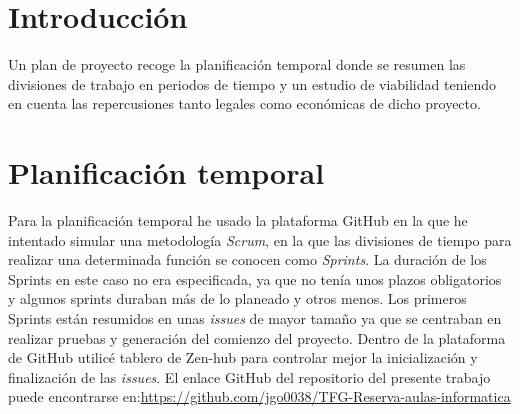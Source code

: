 
\section{Introducción}
Un plan de proyecto recoge la planificación temporal donde se resumen las divisiones de trabajo en periodos de tiempo y un estudio de viabilidad teniendo en cuenta las repercusiones tanto legales como económicas de dicho proyecto.

\section{Planificación temporal}
Para la planificación temporal he usado la plataforma GitHub en la que he intentado simular una metodología \textit{Scrum}, en la que las divisiones de tiempo para realizar una determinada función se conocen como \textit{Sprints}. La duración de los Sprints en este caso no era especificada, ya que no tenía unos plazos obligatorios y algunos sprints duraban más de lo planeado y otros menos. Los primeros Sprints están resumidos en unas \textit{issues} de mayor tamaño ya que se centraban en realizar pruebas y generación del comienzo del proyecto.\newline
Dentro de la plataforma de GitHub utilicé tablero de Zen-hub para controlar mejor la inicialización y finalización de las \textit{issues}.\newline
El enlace GitHub del repositorio del presente trabajo puede encontrarse en:\newline \url{https://github.com/jgo0038/TFG-Reserva-aulas-informatica} \newline


